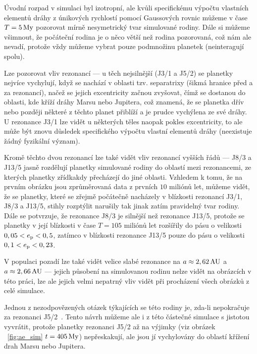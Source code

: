 \documentclass[A4paper, 12pt, oneside]{book}
\begin{document}
Úvodní rozpad v simulaci byl izotropní, ale kvůli specifickému výpočtu vlastních elementů dráhy z únikových rychlostí pomocí Gaussových rovnic můžeme v čase $T=5\,{\rm My}$ pozorovat mírně nesymetrický tvar simulované rodiny. Dále si můžeme všimnout, že počáteční rodina je o něco větší než rodina pozorovaná, což nám ale nevadí, protože vždy můžeme vybrat pouze podmnožinu planetek (neinteragují spolu).

Lze pozorovat vliv rezonancí --- u těch nejsilnější (J3/1 a J5/2) se planetky nejvíce vychylují, když se nachází v oblasti tzv. separatrixy (šikmá hranice před a za rezonancí), načež se jejich excentricity začnou zvyšovat, čímž se dostanou do oblasti, kde kříží dráhy Marsu nebo Jupitera, což znamená, že se planetka dřív nebo později některé z těchto planet přiblíží a je prudce vychýlena ze své dráhy. U rezonance J3/1 lze vidět u některých těles naopak pokles excentricity, to ale může být znovu důsledek specifického výpočtu vlastní elementů dráhy (neexistuje žádný fyzikální význam).

Kromě těchto dvou rezonancí lze také vidět vliv rezonancí vyšších řádů --- J8/3 a J13/5 jasně rozdělují planetky simulované rodiny do oblastí mezi rezonancemi, ze kterých planetky zřídkakdy přecházejí do jiné oblasti. Vzhledem k tomu, že na prvním obrázku jsou zprůměrovaná data z prvních $10$ miliónů let, můžeme vidět, že se planetky, které se zřejmě počátečně nacházely v blízkosti rezonancí J3/1, J8/3 a J13/5, stihly rozptýlit narušily tak jinak zatím pravidelný tvar rodiny. Dále se potvrzuje, že rezonance J8/3 je silnější než rezonance J13/5, protože se planetky v její blízkosti v čase $T=105$ miliónů let rozšířily do pásu o velikosti $0,05<e_{\rm p}<0,5$, zatímco v blízkosti rezonance J13/5 pouze do pásu o velikosti $0,1<e_{\rm p}<0,23$.

V populaci pozadí lze také vidět velice slabé rezonance na $a\approx2,62\,{\rm AU}$ a $a\approx2,66\,{\rm AU}$ --- jejich působení na simulovanou rodinu nelze vidět na obrázcích v této práci, lze ale jejich velmi nepatrný vliv vidět při procházení všech obrázků z celé simulace.

Jednou z nezodpovězených otázek týkajících se této rodiny je, zda-li nepokračuje za rezonanci J5/2~\cite{nesvorny15}. Tento návrh můžeme ale i z této částečné simulace s jistotou vyvrátit, protože planetky rezonanci J5/2 až na výjimky (viz obrázek ~\ref{fig:ae_sim} $t=405\,{\rm My}$) nepřeskakují, ale jsou jí vychylovány do oblastí křížení drah Marsu nebo Jupitera.
\end{document}
